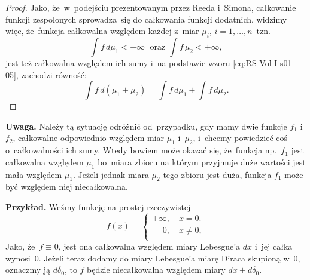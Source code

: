 \documentclass[a4paper,11pt]{article}
\begin{document}
\begin{proof}
  Jako, że~w~podejściu prezentowanym przez Reeda i~Simona, całkowanie
  funkcji zespolonych sprowadza~się do całkowania funkcji dodatnich,
  widzimy więc, że~funkcja całkowalna względem każdej z~miar
  $\mu_{ i }$, $i = 1, \ldots, n$~tzn.
  \begin{equation}
    \label{eq:RS-Vol-I-s01-05}
    \int f \, d\mu_{ 1 } < +\infty \; \textrm{  oraz  }
    \int f \, \mu_{ 2 } < +\infty,
  \end{equation}
  jest też całkowalna względem ich sumy i~na podstawie wzoru
  \eqref{eq:RS-Vol-I-s01-05}, zachodzi równość:
  \begin{equation}
    \label{eq:RS-Vol-I-s01-06}
    \int f \, d( \mu_{ 1 } + \mu_{ 2 } )
    = \int f \, d\mu_{ 1 }  + \int f \, d\mu_{ 2 }.
  \end{equation}

\end{proof}





\textbf{Uwaga.} Należy tą sytuację odróżnić od~przypadku, gdy mamy dwie
funkcje $f_{ 1 }$ i~$f_{ 2 }$, całkowalne odpowiednio względem miar
$\mu_{ 1 }$ i~$\mu_{ 2 }$, i~chcemy powiedzieć coś o~całkowalności ich
sumy. Wtedy bowiem może okazać się, że~funkcja np.~$f_{ 1 }$ jest
całkowalna względem $\mu_{ 1 }$ bo~miara zbioru na którym przyjmuje
duże wartości jest mała względem $\mu_{ 1 }$. Jeżeli jednak miara
$\mu_{ 2 }$ tego zbioru jest duża, funkcja $f_{ 1 }$ może być względem
niej niecałkowalna.

\textbf{Przykład.} Weźmy funkcję na prostej rzeczywistej
\begin{equation}
  \label{eq:RS-Vol-I-s01-07}
  f( x ) =
  \begin{cases}
    +\infty, \quad x = 0. \\
    \quad \;0, \quad x \neq 0, \\
  \end{cases}
\end{equation}
Jako, że~$f \equiv 0$, jest ona całkowalna względem miary Lebesgue'a
$dx$ i~jej całka wynosi~0. Jeżeli teraz dodamy do miary Lebesgue'a
miarę Diraca skupioną w~0, oznaczmy ją $d\delta_{ 0 }$, to $f$ będzie
niecałkowalna względem miary $dx + d\delta_{ 0 }$. %

\vspace{\spaceThree}
\end{document}
